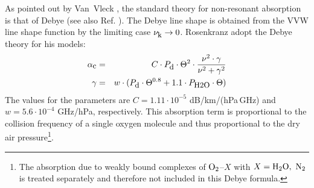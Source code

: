 {
\label{levele:pwr98_o2cont}
As pointed out by Van~Vleck \cite{vv:87}, the standard theory for
non-resonant absorption is that of Debye (see also Ref. \cite{townes:55}). 
The Debye line shape is obtained from the VVW line shape function by
the limiting case $\nu_{\mbox{\rm \small k}} \rightarrow 0$.
Rosenkranz \cite{pwr:93} adopt the Debye theory for his models: 
\begin{eqnarray}
  \label{eq:pwr_o2cont}
  \alphac &=&  C \cdot \pda \cdot \Theta^2 \cdot 
             \frac{\nu^2 \cdot \gamma}{\nu^2+\gamma^2}\\
%
  \label{eq:pwr_o2cont_1}
  \gamma &=&  w \cdot (\pda \cdot \Theta^{0.8} + 1.1 \cdot \phzo \cdot
  \Theta)
\end{eqnarray}
The values for the parameters are $C = 1.11\cdot 10^{-5}$ dB/km/(hPa\,GHz) and 
$w = 5.6 \cdot 10^{-4}$ GHz/hPa, respectively. This absorption
term is proportional to the collision frequency of a single oxygen molecule
and thus proportional to the dry air pressure\footnote{The absorption
  due to weakly bound complexes of $\mbox{O}_2$--$X$ with $X=\mbox{H}_2\mbox{O},~\mbox{N}_2$ is 
  treated separately and therefore not included in this Debye
  formula.}.






\label{levelb:O2_mpm93}

}
